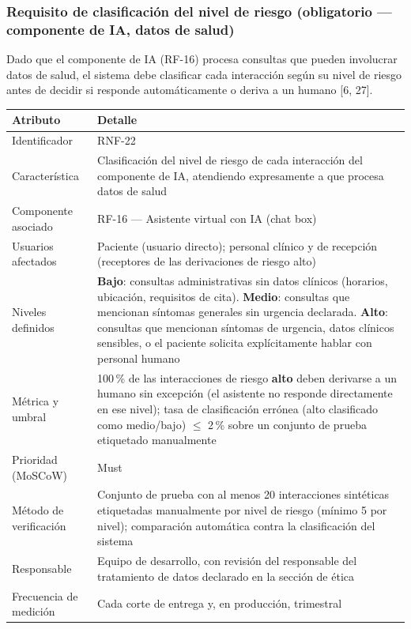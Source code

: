\documentclass[11pt,a4paper]{article}
\begin{document}
	
	\subsubsection{Requisito de clasificación del nivel de riesgo (obligatorio — componente de IA, datos de salud)}
	
	Dado que el componente de IA (RF-16) procesa consultas que pueden
	involucrar datos de salud, el sistema debe clasificar cada interacción
	según su nivel de riesgo antes de decidir si responde automáticamente
	o deriva a un humano [6, 27].
	
	\begin{center}
		\begin{tabular}{|p{3.2cm}|p{9.5cm}|}
			\hline
			\textbf{Atributo} & \textbf{Detalle} \\
			\hline
			Identificador & RNF-22 \\
			\hline
			Característica &
			Clasificación del nivel de riesgo de cada interacción del componente
			de IA, atendiendo expresamente a que procesa datos de salud \\
			\hline
			Componente asociado & RF-16 --- Asistente virtual con IA (chat box) \\
			\hline
			Usuarios afectados & Paciente (usuario directo); personal clínico y de
			recepción (receptores de las derivaciones de riesgo alto) \\
			\hline
			Niveles definidos &
			\textbf{Bajo}: consultas administrativas sin datos clínicos (horarios,
			ubicación, requisitos de cita).
			\textbf{Medio}: consultas que mencionan síntomas generales sin
			urgencia declarada.
			\textbf{Alto}: consultas que mencionan síntomas de urgencia, datos
			clínicos sensibles, o el paciente solicita explícitamente hablar con
			personal humano \\
			\hline
			Métrica y umbral &
			100\,\% de las interacciones de riesgo \textbf{alto} deben derivarse a
			un humano sin excepción (el asistente no responde directamente en
			ese nivel); tasa de clasificación errónea (alto clasificado como
			medio/bajo) \(\leq\) 2\,\% sobre un conjunto de prueba etiquetado
			manualmente \\
			\hline
			Prioridad (MoSCoW) & Must \\
			\hline
			Método de verificación &
			Conjunto de prueba con al menos 20 interacciones sintéticas
			etiquetadas manualmente por nivel de riesgo (mínimo 5 por nivel);
			comparación automática contra la clasificación del sistema \\
			\hline
			Responsable & Equipo de desarrollo, con revisión del responsable del
			tratamiento de datos declarado en la sección de ética \\
			\hline
			Frecuencia de medición & Cada corte de entrega y, en producción,
			trimestral \\
			\hline
		\end{tabular}
	\end{center}
	
\end{document}
